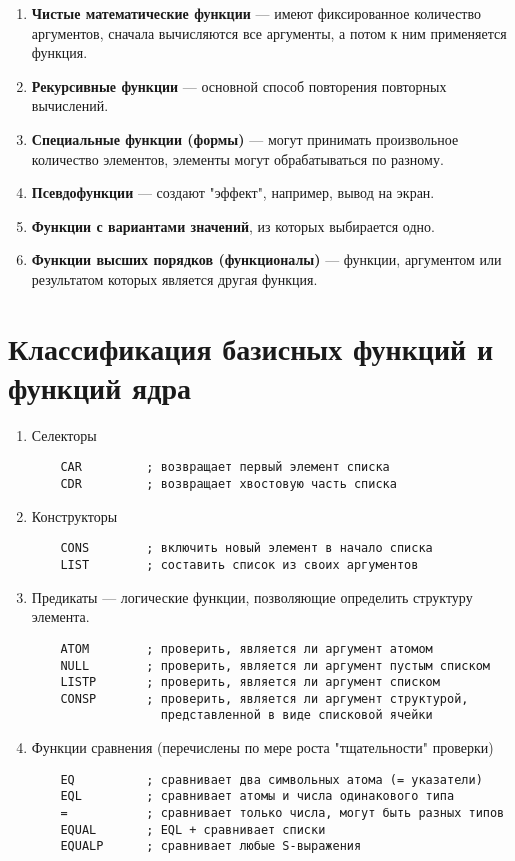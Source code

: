 \begin{enumerate}
    \item \textbf{Чистые математические функции} --- имеют фиксированное количество аргументов, сначала вычисляются все аргументы, а потом к ним применяется функция.
    \item \textbf{Рекурсивные функции} --- основной способ повторения повторных вычислений.
    \item \textbf{Специальные функции (формы)} --- могут принимать произвольное количество элементов, элементы могут обрабатываться по разному.
    \item \textbf{Псевдофункции} --- создают "эффект", например, вывод на экран.
    \item \textbf{Функции с вариантами значений}, из которых выбирается одно.
    \item \textbf{Функции высших порядков (функционалы)} --- функции, аргументом или результатом которых является другая функция.
\end{enumerate}

\section{Классификация базисных функций и функций ядра}
\begin{enumerate}
    \item Селекторы 
    \begin{lstlisting}
    CAR         ; возвращает первый элемент списка
    CDR         ; возвращает хвостовую часть списка
    \end{lstlisting}

    \item Конструкторы
    \begin{lstlisting}
    CONS        ; включить новый элемент в начало списка
    LIST        ; составить список из своих аргументов
    \end{lstlisting}

    \item Предикаты --- логические функции, позволяющие определить структуру элемента.
    \begin{lstlisting}
    ATOM        ; проверить, является ли аргумент атомом
    NULL        ; проверить, является ли аргумент пустым списком
    LISTP       ; проверить, является ли аргумент списком
    CONSP       ; проверить, является ли аргумент структурой,   
                  представленной в виде списковой ячейки
    \end{lstlisting}

    \item Функции сравнения (перечислены по мере роста "тщательности" проверки)
    \begin{lstlisting}
    EQ          ; сравнивает два символьных атома (= указатели)
    EQL         ; сравнивает атомы и числа одинакового типа
    =           ; сравнивает только числа, могут быть разных типов
    EQUAL       ; EQL + сравнивает списки 
    EQUALP      ; сравнивает любые S-выражения
    \end{lstlisting}
    
\end{enumerate}

